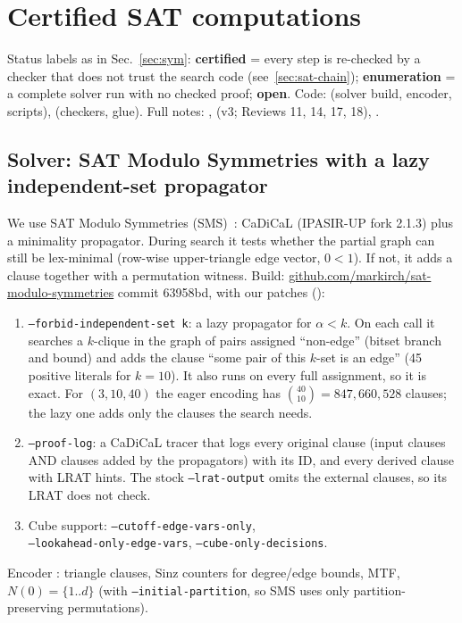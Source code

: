 \section{Certified SAT computations}\label{sec:sat}

Status labels as in Sec.~\ref{sec:sym}: \textbf{certified} = every step is re-checked by a checker that does not trust the
search code (see~\ref{sec:sat-chain}); \textbf{enumeration} = a complete solver run with no checked proof; \textbf{open}.
Code:  (solver build, encoder, scripts),  (checkers, glue). Full notes: ,
 (v3; Reviews 11, 14, 17, 18), .

\subsection{Solver: SAT Modulo Symmetries with a lazy independent-set propagator}\label{sec:sat-solver}
We use SAT Modulo Symmetries (SMS)~\cite{KS24}: CaDiCaL
(IPASIR-UP fork 2.1.3) plus a minimality propagator. During search it tests whether the partial graph can
still be lex-minimal (row-wise upper-triangle edge vector, $0 < 1$). If not, it adds a clause together with a
permutation witness. Build: \url{github.com/markirch/sat-modulo-symmetries} commit 63958bd, with our patches
():
\begin{enumerate}
\item \texttt{--forbid-independent-set k}: a lazy propagator for $\alpha < k$. On each call it searches a $k$-clique in the
   graph of pairs assigned ``non-edge'' (bitset branch and bound) and adds the clause ``some pair of this
   $k$-set is an edge'' (45 positive literals for $k = 10$). It also runs on every full assignment, so it is exact.
   For $(3,10,40)$ the eager encoding has $\binom{40}{10} = 847{,}660{,}528$ clauses; the lazy one adds only the clauses
   the search needs.
\item \texttt{--proof-log}: a CaDiCaL tracer that logs every original clause (input clauses AND clauses added by the
   propagators) with its ID, and every derived clause with LRAT hints. The stock \texttt{--lrat-output} omits the
   external clauses, so its LRAT does not check.
\item Cube support: \texttt{--cutoff-edge-vars-only},\\ \texttt{--lookahead-only-edge-vars}, \texttt{--cube-only-decisions}.
\end{enumerate}
Encoder : triangle clauses, Sinz counters for degree/edge bounds, MTF, $N(0) = \{1..d\}$
(with \texttt{--initial-partition}, so SMS uses only partition-preserving permutations).

